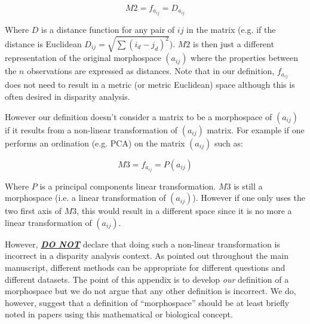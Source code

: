 \documentclass[12pt,letterpaper]{article}
\begin{document}
\begin{equation}
    M2 = f_{a_{ij}} = D_{a_{ij}}
\end{equation}

\noindent Where $D$ is a distance function for any pair of $ij$ in the matrix (e.g. if the distance is Euclidean $D_{ij} = \sqrt{\sum(i_{d}-j_{d})^2}$).
$M2$ is then just a different representation of the original morphospace $(a_{ij})$ where the properties between the $n$ observations are expressed as distances.
Note that in our definition, $f_{a_{ij}}$ does not need to result in a metric (or metric Euclidean) space although this is often desired in disparity analysis.

However our definition doesn't consider a matrix to be a morphospace of $(a_{ij})$ if it results from a non-linear transformation of $(a_{ij})$ matrix.
For example if one performs an ordination (e.g. PCA) on the matrix $(a_{ij})$ such as:

\begin{equation}
    M3 = f_{a_{ij}} = P(a_{ij})
\end{equation}

\noindent Where $P$ is a principal components linear transformation.
$M3$ is still a morphospace (i.e. a linear transformation of $(a_{ij})$). However if one only uses the two first axis of $M3$, this would result in a different space since it is no more a linear transformation of $(a_{ij})$.

However, \textbf{\underline{\textit{DO NOT}}} declare that doing such a non-linear transformation is incorrect in a disparity analysis context.
As pointed out throughout the main manuscript, different methods can be appropriate for different questions and different datasets.
The point of this appendix is to develop \textit{our} definition of a morphospace but we do not argue that any other definition is incorrect.
We do, however, suggest that a definition of ``morphospace'' should be at least briefly noted in papers using this mathematical or biological concept.




\end{document}
